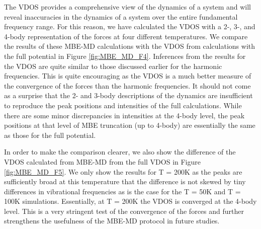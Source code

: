\documentclass[11pt, proquest]{uwthesis}[2020/02/24]
\begin{document}
\par The VDOS provides a comprehensive view of the dynamics of a system and will reveal inaccuracies in the dynamics of a system over the entire fundamental frequency range. For this reason, we have calculated the VDOS with a 2-, 3-, and 4-body representation of the forces at four different temperatures. We compare the results of these MBE-MD calculations with the VDOS from calculations with the full potential in Figure \ref{fig:MBE_MD_F4}. Inferences from the results for the VDOS are quite similar to those discussed earlier for the harmonic frequencies. This is quite encouraging as the VDOS is a much better measure of the convergence of the forces than the harmonic frequencies. It should not come as a surprise that the 2- and 3-body descriptions of the dynamics are insufficient to reproduce the peak positions and intensities of the full calculations. While there are some minor discrepancies in intensities at the 4-body level, the peak positions at that level of MBE truncation (up to 4-body) are essentially the same as those for the full potential.

\par In order to make the comparison clearer, we also show the difference of the VDOS calculated from MBE-MD from the full VDOS in Figure \ref{fig:MBE_MD_F5}. We only show the results for T = 200K as the peaks are sufficiently broad at this temperature that the difference is not skewed by tiny differences in vibrational frequencies as is the case for the T = 50K and T = 100K simulations. Essentially, at T = 200K the VDOS is converged at the 4-body level. This is a very stringent test of the convergence of the forces and further strengthens the usefulness of the MBE-MD protocol in future studies.
\end{document}
